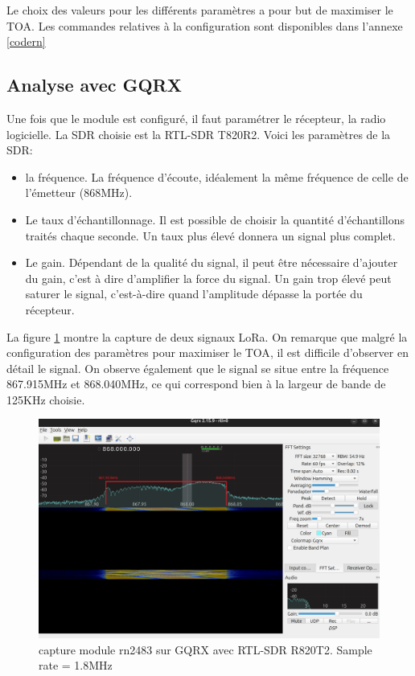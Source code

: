 \vspace{0.1cm}

Le choix des valeurs pour les différents paramètres a pour but de maximiser le \ac{TOA}. Les commandes relatives à la configuration sont disponibles dans l'annexe \ref{codern}

\subsection{Analyse avec GQRX}

Une fois que le module est configuré, il faut paramétrer le récepteur, la radio logicielle. La \ac{SDR} choisie est la RTL-SDR T820R2. Voici les paramètres de la \ac{SDR}:

\vspace{0.1cm}

\begin{itemize}
\item la fréquence. La fréquence d'écoute, idéalement la même fréquence de celle de l'émetteur (868MHz).
\item Le taux d'échantillonnage. Il est possible de choisir la quantité d'échantillons traités chaque seconde. Un taux plus élevé donnera un signal plus complet.
\item Le gain. Dépendant de la qualité du signal, il peut être nécessaire d'ajouter du gain, c'est à dire d'amplifier la force du signal. Un gain trop élevé peut saturer le signal, c'est-à-dire quand l'amplitude dépasse la portée du récepteur.
\end{itemize}

\vspace{0.1cm}

La figure \ref{term301} montre la capture de deux signaux LoRa. On remarque que malgré la configuration des paramètres pour maximiser le \ac{TOA}, il est difficile d'observer en détail le signal. On observe également que le signal se situe entre la fréquence 867.915MHz et 868.040MHz, ce qui correspond bien à la largeur de bande de 125KHz choisie.

\begin{figure}[h]
\centering

\includegraphics[scale=0.28]{images/gqrx4.png}
\caption{capture module rn2483 sur GQRX avec RTL-SDR R820T2. Sample rate = 1.8MHz}\label{term301}
\end{figure}

